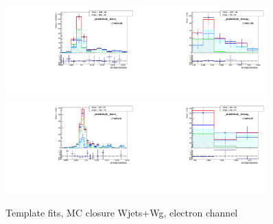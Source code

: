\begin{figure}[htb]
\begin{center}
   \includegraphics[width=0.45\textwidth]{../figs/figs_v11/ELECTRON_WGamma/MCclosureWjetsPlusWg/c_TEMPL_SIHIH_UNblind__phoEt25to30__Barrel__RooFit_MCclosure.pdf}\includegraphics[width=0.45\textwidth]{../figs/figs_v11/ELECTRON_WGamma/MCclosureWjetsPlusWg/c_TEMPL_SIHIH_UNblind__phoEt25to30__Endcap__RooFit_MCclosure.pdf}\\
   \includegraphics[width=0.45\textwidth]{../figs/figs_v11/ELECTRON_WGamma/MCclosureWjetsPlusWg/c_TEMPL_SIHIH_UNblind__phoEt30to35__Barrel__RooFit_MCclosure.pdf}\includegraphics[width=0.45\textwidth]{../figs/figs_v11/ELECTRON_WGamma/MCclosureWjetsPlusWg/c_TEMPL_SIHIH_UNblind__phoEt30to35__Endcap__RooFit_MCclosure.pdf}\\
  \label{fig:templateFits_MCclosureWjetsPlusWg_SIHIH_ELECTRON_1}
  \caption{Template fits, MC closure Wjets+Wg, electron channel}
  \end{center}
\end{figure}

